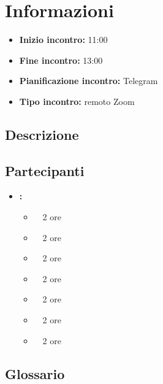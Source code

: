 \section{Informazioni}
\begin{itemize}
	\item \textbf{Inizio incontro:} 11:00
	\item \textbf{Fine incontro:} 13:00
	\item \textbf{Pianificazione incontro:} Telegram
	\item \textbf{Tipo incontro:} remoto Zoom
\end{itemize}

\subsection{Descrizione}
\DocDescription

\subsection{Partecipanti}

\begin{itemize}
	\item \textbf{\GroupName:}
	\begin{itemize}
		\item \tommaso \ \rightarrow\ 2 ore
		\item \marco \ \rightarrow\ 2 ore
		\item \riccardo \ \rightarrow\ 2 ore
		\item \raul \ \rightarrow\ 2 ore
		\item \martina \ \rightarrow\ 2 ore
		\item \sebastiano \ \rightarrow\ 2 ore
		\item \mattia \ \rightarrow\ 2 ore
	\end{itemize}
\end{itemize}

\subsection{Glossario}
\GlossarioIntroduzione

\clearpage